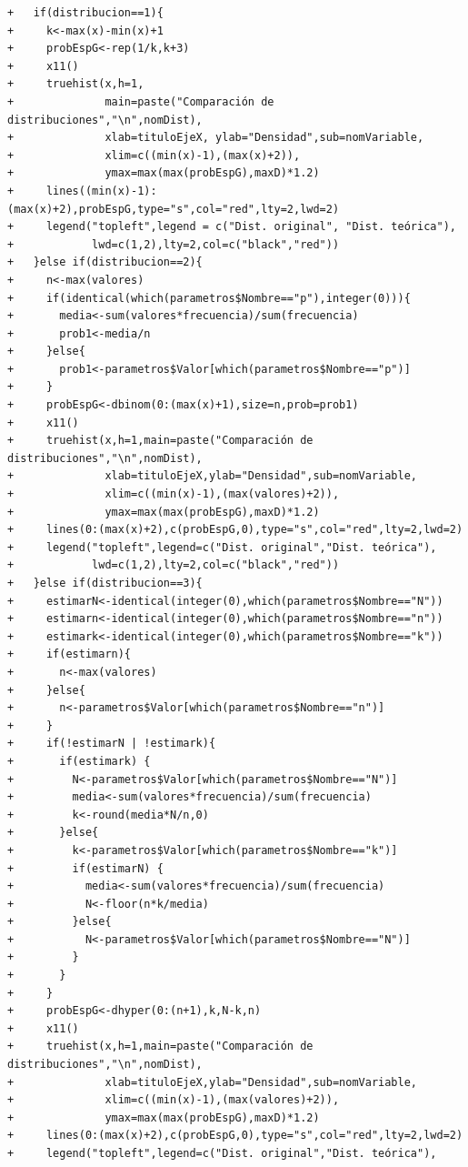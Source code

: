 \begin{solucion}
\begin{verbatim}
+   if(distribucion==1){
+     k<-max(x)-min(x)+1
+     probEspG<-rep(1/k,k+3)
+     x11()
+     truehist(x,h=1,
+              main=paste("Comparación de distribuciones","\n",nomDist),
+              xlab=tituloEjeX, ylab="Densidad",sub=nomVariable,
+              xlim=c((min(x)-1),(max(x)+2)),
+              ymax=max(max(probEspG),maxD)*1.2)
+     lines((min(x)-1):(max(x)+2),probEspG,type="s",col="red",lty=2,lwd=2)
+     legend("topleft",legend = c("Dist. original", "Dist. teórica"),
+            lwd=c(1,2),lty=2,col=c("black","red"))
+   }else if(distribucion==2){
+     n<-max(valores)
+     if(identical(which(parametros$Nombre=="p"),integer(0))){
+       media<-sum(valores*frecuencia)/sum(frecuencia)
+       prob1<-media/n
+     }else{
+       prob1<-parametros$Valor[which(parametros$Nombre=="p")]
+     }
+     probEspG<-dbinom(0:(max(x)+1),size=n,prob=prob1)
+     x11()
+     truehist(x,h=1,main=paste("Comparación de distribuciones","\n",nomDist),
+              xlab=tituloEjeX,ylab="Densidad",sub=nomVariable,
+              xlim=c((min(x)-1),(max(valores)+2)),
+              ymax=max(max(probEspG),maxD)*1.2)
+     lines(0:(max(x)+2),c(probEspG,0),type="s",col="red",lty=2,lwd=2)
+     legend("topleft",legend=c("Dist. original","Dist. teórica"),
+            lwd=c(1,2),lty=2,col=c("black","red"))
+   }else if(distribucion==3){
+     estimarN<-identical(integer(0),which(parametros$Nombre=="N"))
+     estimarn<-identical(integer(0),which(parametros$Nombre=="n"))
+     estimark<-identical(integer(0),which(parametros$Nombre=="k"))
+     if(estimarn){
+       n<-max(valores)
+     }else{
+       n<-parametros$Valor[which(parametros$Nombre=="n")]
+     }
+     if(!estimarN | !estimark){
+       if(estimark) {
+         N<-parametros$Valor[which(parametros$Nombre=="N")]
+         media<-sum(valores*frecuencia)/sum(frecuencia)
+         k<-round(media*N/n,0)
+       }else{
+         k<-parametros$Valor[which(parametros$Nombre=="k")]
+         if(estimarN) {
+           media<-sum(valores*frecuencia)/sum(frecuencia)
+           N<-floor(n*k/media)
+         }else{
+           N<-parametros$Valor[which(parametros$Nombre=="N")]
+         }
+       }
+     }
+     probEspG<-dhyper(0:(n+1),k,N-k,n)
+     x11()
+     truehist(x,h=1,main=paste("Comparación de distribuciones","\n",nomDist),
+              xlab=tituloEjeX,ylab="Densidad",sub=nomVariable,
+              xlim=c((min(x)-1),(max(valores)+2)),
+              ymax=max(max(probEspG),maxD)*1.2)
+     lines(0:(max(x)+2),c(probEspG,0),type="s",col="red",lty=2,lwd=2)
+     legend("topleft",legend=c("Dist. original","Dist. teórica"),

\end{verbatim}
\end{solucion}
